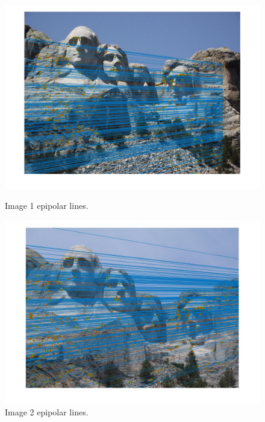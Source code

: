 \documentclass{article}
\begin{document}
\begin{center}
\begin{figure}[H]
  \centering
  \begin{minipage}[b]{0.4\textwidth}
    \includegraphics[scale=0.2]{mount_rushmore_img1_epipolar_lines.jpg}
    \caption{Image 1 epipolar lines.}
  \end{minipage}
  \hfill
  \begin{minipage}[b]{0.4\textwidth}
    \includegraphics[scale=0.2]{mount_rushmore_img2_epipolar_lines.jpg}
    \caption{Image 2 epipolar lines.}
  \end{minipage}
\end{figure}
\end{center}
\end{document}
